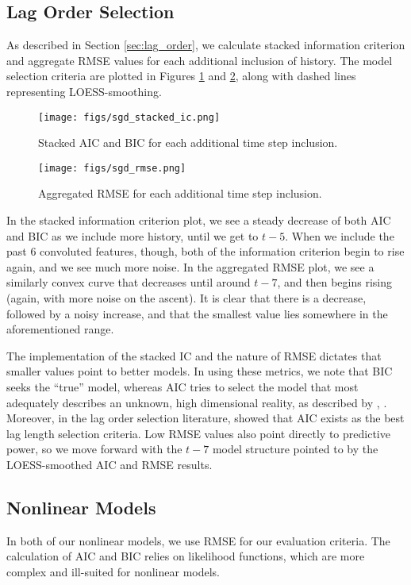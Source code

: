 \documentclass[master]{subfiles}
\begin{document}
\subsection{Lag Order Selection}\label{sec:lag-order-results}
As described in Section \ref{sec:lag_order}, we calculate stacked information criterion and aggregate RMSE values for each additional inclusion of history.  The model selection criteria are plotted in Figures \ref{fig:stacked_ic} and \ref{fig:rmse}, along with dashed lines representing LOESS-smoothing.
\begin{figure}[H]
\centering
\texttt{[image: figs/sgd\_stacked\_ic.png]}
\caption{Stacked AIC and BIC for each additional time step inclusion.}
\label{fig:stacked_ic}
\end{figure}
\begin{figure}[H]
\centering
\texttt{[image: figs/sgd\_rmse.png]}
\caption{Aggregated RMSE for each additional time step inclusion.}
\label{fig:rmse}
\end{figure}
In the stacked information criterion plot, we see a steady decrease of both AIC and BIC as we include more history, until we get to $t-5$.  When we include the past 6 convoluted features, though, both of the information criterion begin to rise again, and we see much more noise.  In the aggregated RMSE plot, we see a similarly convex curve that decreases until around $t-7$, and then begins rising (again, with more noise on the ascent).  It is clear that there is a decrease, followed by a noisy increase, and that the smallest value lies somewhere in the aforementioned range.\par
The implementation of the stacked IC and the nature of RMSE dictates that smaller values point to better models.  In using these metrics, we note that BIC seeks the ``true'' model, whereas AIC tries to select the model that most adequately describes an unknown, high dimensional reality, as described by \cite{aic_bic1}, \cite{aic_bic2}.  Moreover, in the lag order selection literature, \cite{liew} showed that AIC exists as the best lag length selection criteria.  Low RMSE values also point directly to predictive power, so we move forward with the $t-7$ model structure pointed to by the LOESS-smoothed AIC and RMSE results.
\subsection{Nonlinear Models}
In both of our nonlinear models, we use RMSE for our evaluation criteria.  The calculation of AIC and BIC relies on likelihood functions, which are more complex and ill-suited for nonlinear models.
\end{document}
